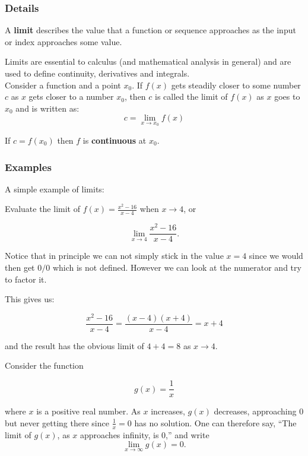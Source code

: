 \documentclass[12pt,a4paper]{article}
\theoremstyle{regla}
\theoremstyle{remark}
\theoremstyle{definition}
\theoremstyle{nonumberbreak}
\begin{document}
\subsubsection{Details}
\begin {defn}
A {\bf limit} describes the value that a function or sequence approaches as the input or index approaches some value. 
\end{defn}
Limits are essential to calculus (and mathematical analysis in general) and are used to define continuity, derivatives and integrals.\\

Consider a function and a point ${x}_0$. If $ f(x) $ gets steadily closer to some number $c$ as $x$ gets closer to a number $x_0$, then $c$ is called the limit of  $f(x)$ as $x$ goes to $x_0$ and is written as: 
$$ 
c= \lim_{x\to x_0}f(x)
$$

If $c = f(x_0)$ then $f$ is {\bf continuous} at $x_0$.
\subsubsection{Examples}
\begin{xmpl}
A simple example of limits: 

Evaluate the limit of $f(x) = \frac{x^{2}-16}{x-4} $ when $x\rightarrow 4$, or

$$\lim_{x\rightarrow 4} \frac{x^{2}-16}{x-4}.$$

 

Notice that in principle we can not simply stick in the value $x=4$ since we would then get 
$0/0$ which is not defined. However we can look at the numerator and try to factor it.

This gives us: 

$$\frac{x^{2}-16}{x-4} = \frac{(x-4)(x+4)}{x-4} = x +4$$

and the result has the obvious limit of $4+4=8$ as $x\to 4$.

\end{xmpl}
\begin{xmpl}

Consider the function

$$ g (x ) =  \frac{1}{x}$$

where $x$ is a positive real number. As $x$ increases, $g(x)$ decreases, approaching 0 but never getting there since $\frac{1}{x}=0$ has no solution. One can therefore say, “The limit of $g(x)$, as $x$ approaches infinity, is 0,” and write
$$ 
\lim_{x\to\infty} g(x)=0.
$$
\end{xmpl}
\end{document}
